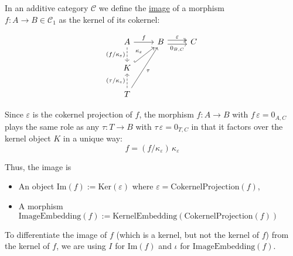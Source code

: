 \begin{definition}[Image]
In an additive category $\mathcal{C}$ we define the \ul{image} of a morphism\\
$f : A \rightarrow B \in \mathcal{C}_{1}$ as the kernel of its cokernel:\\
\begin{minipage}{.06\textwidth} \phantom{} \end{minipage}
\begin{minipage}{.39\textwidth}
\[
\begin{tikzcd}[
  ampersand replacement=\&,
]
A \arrow[r, "f"] \arrow[d, "(f/\kappa_{\varepsilon})"', dashed]         \& B \arrow[r, "\varepsilon", shift left, two heads]
\arrow[r, "{0_{B,C}}"', shift right] \& C \\
K \arrow[ru, "\kappa_{\varepsilon}", hook]                                    \&                            \&   \\
T \arrow[u, "(\tau/\kappa_{\varepsilon})", dashed] \arrow[ruu, "\tau"'] \&                            \&  
\end{tikzcd}
\]
\end{minipage}
\begin{minipage}{.49\textwidth}
Since $\varepsilon$ is the cokernel projection of $f$, the morphism $f : A \rightarrow B$ with $f\,\varepsilon = 0_{A,C}$ plays the
same role as any $\tau : T \rightarrow B$ with $\tau\,\varepsilon = 0_{T,C}$ in that it factors over the kernel object $K$ in a
unique way: 
\[
f = (f/\kappa_{\varepsilon})\,\kappa_{\varepsilon}
\]
\end{minipage}
\begin{minipage}{.06\textwidth} \phantom{} \end{minipage}

Thus, the image is
\begin{itemize}
\item An object $\mathrm{Im}(f) := \mathrm{Ker}(\varepsilon)$ where $\varepsilon = \mathrm{CokernelProjection}(f)$,
\item A morphism $\mathrm{ImageEmbedding}(f) := \mathrm{KernelEmbedding}(\mathrm{CokernelProjection}(f))$
\end{itemize}
To differentiate the image of $f$ (which is a kernel, but not the kernel of $f$) from the kernel of $f$,
we are using $I$ for $\mathrm{Im}(f)$ and $\iota$ for $\mathrm{ImageEmbedding}(f)$.
\end{definition}

